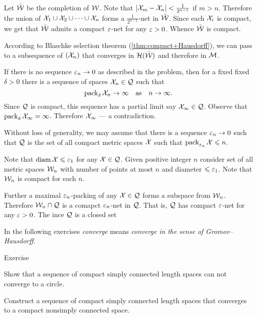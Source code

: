 Let $\bar{\mathcal{W}}$ be the completion of $\mathcal{W}$.
Note that $|\mathcal{X}_m-\mathcal{X}_n|<\tfrac1{2^{n-1}}$ if $m>n$.
Therefore the union of $\mathcal{X}_1\cup \mathcal{X}_2\cup\dots\cup \mathcal{X}_n$ forms a $\tfrac1{2^{n-1}}$-net in $\bar{\mathcal{W}}$.
Since each $\mathcal{X}_i$ is compact, we get that $\bar{\mathcal{W}}$ admits a compact $\varepsilon$-net for any $\varepsilon>0$.
Whence $\bar{\mathcal{W}}$ is compact.

According to Blaschke selection theorem (\ref{thm:compact+Hausdorff}),
we can pass to a subsequence of $(\mathcal{X}_n)$ that converges in $\mathcal{H}(\bar{\mathcal{W}})$ and therefore in $\mathcal{M}$.
\qeds

If there is no sequence $\varepsilon_n\to0$ as described in the problem, then for a fixed fixed $\delta>0$
there is a sequence of spaces $\mathcal{X}_n\in\mathcal{Q}$ such that $$\operatorname{\rm pack}_\delta \mathcal{X}_n\to\infty
\quad\text{as}\quad
n\to\infty.$$
Since $\mathcal{Q}$ is compact, 
this sequence has a partial limit say $\mathcal{X}_\infty\in\mathcal{Q}$.
Observe that $\operatorname{\rm pack}_{\delta} \mathcal{X}_\infty=\infty$.
Therefore $\mathcal{X}_\infty$ --- a contradiction.

Without loss of generality, we may assume that there is a sequence $\varepsilon_n\to 0$ such that 
$\mathcal{Q}$ is the set of all compact metric spaces $\mathcal{X}$ such that
$\operatorname{\rm pack}_{\varepsilon_n} \mathcal{X}\leqslant n$.

Note that $\operatorname{\rm diam}\nolimits \mathcal{X}\leqslant \varepsilon_1$ for any $\mathcal{X}\in \mathcal{Q}$.
Given positive integer $n$ consider set of all metric spaces $\mathcal{W}_n$
with number of points at most $n$ and diameter $\leqslant \varepsilon_1$.
Note that $\mathcal{W}_n$ is compact for each $n$.

Further a maximal $\varepsilon_n$-packing of any $\mathcal{X}\in\mathcal{Q}$ forms a subspace from $\mathcal{W}_n$.
Therefore $\mathcal{W}_n\cap\mathcal{Q}$ is a comapct $\varepsilon_n$-net in  $\mathcal{Q}$.
That is, $\mathcal{Q}$ has compact $\varepsilon$-net for any $\varepsilon>0$.
The ince $\mathcal{Q}$ is a closed set 
\qeds

In the following exercises \emph{converge} means \emph{converge in the sense of Gromov--Hausdorff}.

\begin{thm}{Exercise}\label{ex:GH-SC}
\begin{subthm}{}
Show that a sequence of compact simply connected length spaces can not converge to a circle.
\end{subthm}

\begin{subthm}{}
Construct a sequence of compact simply connected length spaces that converges to a compact nonsimply connected space.
\end{subthm}
\end{thm}

